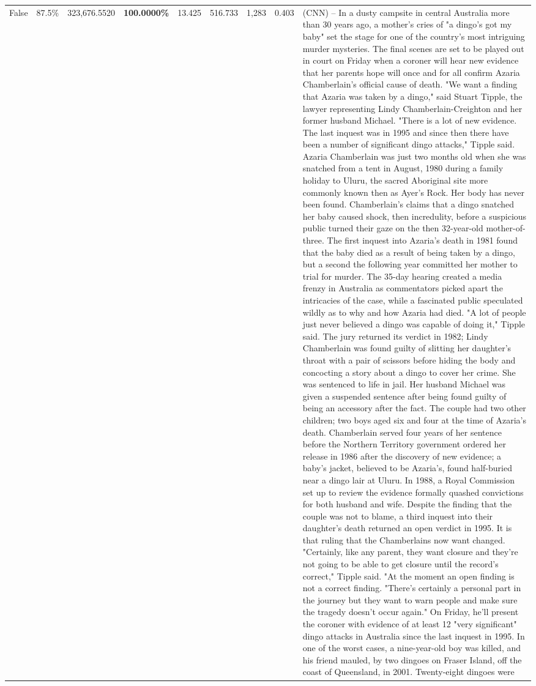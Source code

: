 \begin{table}[H]
\begin{tabular}{lllrlllll}
False & 87.5\% & 323,676.5520 & \bfseries \color{red} 100.0000\% & 13.425 & 516.733 & 1,283 & 0.403 & (CNN) -- In a dusty campsite in central Australia more than 30 years ago, a mother's cries of "a dingo's got my baby" set the stage for one of the country's most intriguing murder mysteries. The final scenes are set to be played out in court on Friday when a coroner will hear new evidence that her parents hope will once and for all confirm Azaria Chamberlain's official cause of death. "We want a finding that Azaria was taken by a dingo," said Stuart Tipple, the lawyer representing Lindy Chamberlain-Creighton and her former husband Michael. "There is a lot of new evidence. The last inquest was in 1995 and since then there have been a number of significant dingo attacks," Tipple said. Azaria Chamberlain was just two months old when she was snatched from a tent in August, 1980 during a family holiday to Uluru, the sacred Aboriginal site more commonly known then as Ayer's Rock. Her body has never been found. Chamberlain's claims that a dingo snatched her baby caused shock, then incredulity, before a suspicious public turned their gaze on the then 32-year-old mother-of-three. The first inquest into Azaria's death in 1981 found that the baby died as a result of being taken by a dingo, but a second the following year committed her mother to trial for murder. The 35-day hearing created a media frenzy in Australia as commentators picked apart the intricacies of the case, while a fascinated public speculated wildly as to why and how Azaria had died. "A lot of people just never believed a dingo was capable of doing it," Tipple said. The jury returned its verdict in 1982; Lindy Chamberlain was found guilty of slitting her daughter's throat with a pair of scissors before hiding the body and concocting a story about a dingo to cover her crime. She was sentenced to life in jail. Her husband Michael was given a suspended sentence after being found guilty of being an accessory after the fact. The couple had two other children; two boys aged six and four at the time of Azaria's death. Chamberlain served four years of her sentence before the Northern Territory government ordered her release in 1986 after the discovery of new evidence; a baby's jacket, believed to be Azaria's, found half-buried near a dingo lair at Uluru. In 1988, a Royal Commission set up to review the evidence formally quashed convictions for both husband and wife. Despite the finding that the couple was not to blame, a third inquest into their daughter's death returned an open verdict in 1995. It is that ruling that the Chamberlains now want changed. "Certainly, like any parent, they want closure and they're not going to be able to get closure until the record's correct," Tipple said. "At the moment an open finding is not a correct finding. "There's certainly a personal part in the journey but they want to warn people and make sure the tragedy doesn't occur again." On Friday, he'll present the coroner with evidence of at least 12 "very significant" dingo attacks in Australia since the last inquest in 1995. In one of the worst cases, a nine-year-old boy was killed, and his friend mauled, by two dingoes on Fraser Island, off the coast of Queensland, in 2001. Twenty-eight dingoes were 
\end{tabular}
\end{table}
